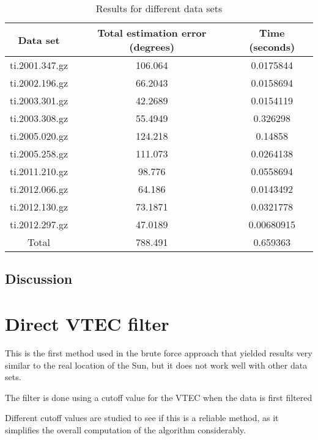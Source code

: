 \begin{table}[h!]
	\centering
	\def\arraystretch{1.2}
	\begin{tabular}{|c c c|} 
		\hline
		Data set & Total estimation error (degrees) & Time (seconds) \\ [0.5ex] 
		\hline\hline
		ti.2001.347.gz & 106.064 & 0.0175844 \\
		\hline
		ti.2002.196.gz & 66.2043 & 0.0158694 \\
		\hline
		ti.2003.301.gz & 42.2689 & 0.0154119 \\
		\hline
		ti.2003.308.gz & 55.4949 & 0.326298 \\
		\hline
		ti.2005.020.gz & 124.218 & 0.14858 \\
		\hline
		ti.2005.258.gz & 111.073 & 0.0264138 \\
		\hline
		ti.2011.210.gz & 98.776 & 0.0558694 \\
		\hline
		ti.2012.066.gz & 64.186 & 0.0143492 \\
		\hline
		ti.2012.130.gz & 73.1871 & 0.0321778 \\
		\hline
		ti.2012.297.gz & 47.0189 & 0.00680915 \\
		\hline\hline
		Total & 788.491 & 0.659363 \\
		\hline
	\end{tabular}
	\caption{Results for different data sets}
\end{table}

\subsection{Discussion}

\section{Direct VTEC filter}

This is the first method used in the brute force approach that yielded results very similar to the real location of the Sun, but it does not work well with other data sets.

The filter is done using a cutoff value for the VTEC when the data is first filtered

Different cutoff values are studied to see if this is a reliable method, as it simplifies the overall computation of the algorithm considerably.


